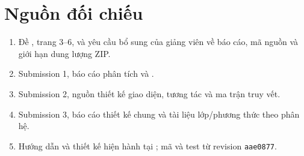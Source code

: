 \section{Nguồn đối chiếu}
\begin{enumerate}
\item Đề , trang 3--6, và yêu cầu bổ sung của
giảng viên về báo cáo, mã nguồn và giới hạn dung lượng ZIP.
\item Submission 1, báo cáo phân tích và .
\item Submission 2, nguồn thiết kế giao diện, tương tác và ma trận truy vết.
\item Submission 3, báo cáo thiết kế chung và tài liệu lớp/phương thức theo phân hệ.
\item Hướng dẫn và thiết kế hiện hành tại ; mã và test từ revision \texttt{aae0877}.
\end{enumerate}
